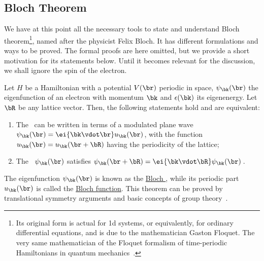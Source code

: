 \subsection{Bloch Theorem}
\label{subsec:bloch_theorem}

We have at this point all the necessary tools to state and understand Bloch theorem\footnote{Its original form is actual for \gls{1d} systems, or equivalently, for ordinary differential equations, and is due to the mathematician Gaston Floquet. The very same mathematician of the Floquet formalism of time-periodic Hamiltonians in quantum mechanics~\cite{Holthaus_2015}.\label{fn:Floquet_formalism}}, named after the physicist Felix Bloch.
It has different formulations and ways to be proved.
The formal proofs are here omitted, but we provide a short motivation for its statements below.
Until it becomes relevant for the discussion, we shall ignore the spin of the electron.

\begin{theorem-non}
    \label{th:Bloch_theorem}
    Let $H$ be a Hamiltonian with a potential $V(\br)$ periodic in space, $\psi_{\bk}(\br)$ the eigenfunction of an electron with momentum $\bk$ and $\epsilon(\bk)$ its eigenenergy.
    Let $\bR$ be any lattice vector.
    Then, the following statements hold and are equivalent:

    \begin{enumerate}[label=(\arabic*),ref=(\arabic*)]
        \item The \wf~can be written in terms of a modulated plane wave $\psi_{\bk}(\br) = \ei{\bk \vdot \br} u_{\bk}(\br)$, with the function $u_{\bk}(\br)=u_{\bk}(\br + \bR)$ having the periodicity of the lattice;  \label{Bloch_theorem_I}
        \item The \wf~$\psi_{\bk}(\br)$ satisfies $\psi_{\bk}(\br + \bR) = \ei{\bk \vdot \bR} \psi_{\bk}(\br)\,$. \label{Bloch_theorem_II}
    \end{enumerate}
\end{theorem-non}

The eigenfunction $\psi_{\bk}(\br)$ is known as the \underline{Bloch \wf}, while its periodic part $u_{\bk}(\br)$ is called the \underline{Bloch function}.
This theorem can be proved by translational symmetry arguments and basic concepts of group theory~\cite{Cohen_Louie_2016,Martin_2004}.

